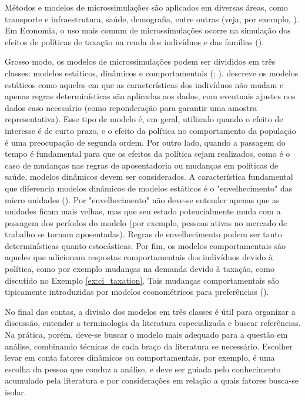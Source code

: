 \documentclass[12pt]{article}
\theoremstyle{break}
\begin{document}
Métodos e modelos de microssimulações são aplicados em diversas áreas, como transporte e infraestrutura, saúde, demografia, entre outras (veja, por exemplo, \cite{o2014handbook}). Em Economia, o uso mais comum de microssimulações ocorre na simulação dos efeitos de políticas de taxação na renda dos indivíduos e das famílias (\cite[capítulo~1]{odonoghue2021}). 

Grosso modo, os modelos de microssimulações podem ser divididos em três classes: modelos estáticos, dinâmicos e comportamentais (\cite[capítulo~1]{mitton2000microsimulation};  \cite{figari2015}). \textcite{figari2015} descreve os modelos estáticos como aqueles em que as características dos indivíduos não mudam e apenas regras determinísticas são aplicadas aos dados, com eventuais ajustes nos dados caso necessário (como reponderação para garantir uma amostra representativa). Esse tipo de modelo é, em geral, utilizado quando o efeito de interesse é de curto prazo, e o efeito da política no comportamento da população é uma preocupação de segunda ordem. Por outro lado, quando a passagem do tempo é fundamental para que os efeitos da política sejam realizados, como é o caso de mudanças nas regras de aposentadoria ou mudanças em políticas de saúde, modelos dinâmicos devem ser considerados. A característica fundamental que diferencia modelos dinâmicos de modelos estáticos é o "envelhecimento" das micro unidades (\cite[capítulo~1]{mitton2000microsimulation}). Por "envelhecimento" não deve-se entender apenas que as unidades ficam mais velhas, mas que seu estado potencialmente muda com a passagem dos períodos do modelo (por exemplo, pessoas ativas no mercado de trabalho se tornam aposentadas). Regras de envelhecimento podem ser tanto determinísticas quanto estocásticas. Por fim, os modelos comportamentais são aqueles que adicionam respostas comportamentais dos indivíduos devido à política, como por exemplo mudanças na demanda devido à taxação, como discutido no Exemplo \ref{ex:ci_taxation}. Tais mudanças comportamentais são tipicamente introduzidas por modelos econométricos para preferências (\cite{figari2015}).

No final das contas, a divisão dos modelos em três classes é útil para organizar a discussão, entender a terminologia da literatura especializada e buscar referências. Na prática, porém, deve-se buscar o modelo mais adequado para a questão em análise, combinando técnicas de cada braço da literatura se necessário. Escolher levar em conta fatores dinâmicos ou comportamentais, por exemplo, é uma escolha da pessoa que conduz a análise, e deve ser guiada pelo conhecimento acumulado pela literatura e por considerações em relação a quais fatores busca-se isolar. 
\end{document}
